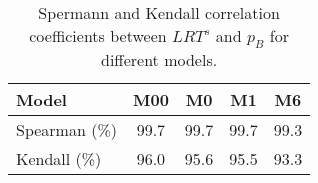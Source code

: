 \documentclass[dvips, lscape]{foils}
\newcommand{\textblue}[1]{\textcolor{blue}{#1}}
\newcommand{\subsection}[1]{\noindent{\large \textblue{#1}}}
\begin{document}
\begin{table}[h]
  \begin{center}
    \begin{tabular}{lcccc}
      Model          & M00 & M0 & M1 & M6  \\
      \hline
      Spearman (\%) & 99.7 & 99.7 & 99.7 & 99.3 \\
      Kendall (\%) & 96.0 & 95.6 & 95.5 & 93.3
    \end{tabular}
    \caption{Spermann and Kendall correlation coefficients between $LRT^s$
      and $p_B$ for different models.}
    \label{Tab:CorrCoef}
  \end{center}
\end{table}




\end{document}
